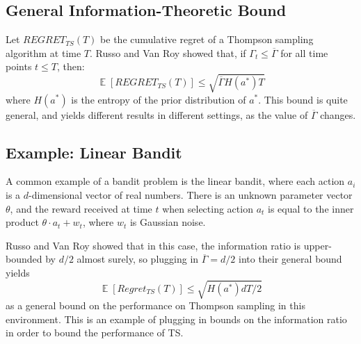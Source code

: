 \documentclass{article}
\DeclareMathOperator{\EX}{\mathbb{E}}
\begin{document}
\subsection{General Information-Theoretic Bound}

Let $REGRET_{TS}(T)$ be the cumulative regret of a Thompson sampling algorithm at time $T$. Russo and Van Roy showed that, if $\Gamma_t\leq \overline{\Gamma}$ for all time points $t\leq T$, then:
$$\EX[REGRET_{TS}(T)] \leq \sqrt{\overline{\Gamma}H(a^*)T}$$
where $H(a^*)$ is the entropy of the prior distribution of $a^*$. This bound is quite general, and yields different results in different settings, as the value of $\overline{\Gamma}$ changes.

\subsection{Example: Linear Bandit}

A common example of a bandit problem is the linear bandit, where each action $a_i$ is a $d$-dimensional vector of real numbers. There is an unknown parameter vector $\theta$, and the reward received at time $t$ when selecting action $a_t$ is equal to the inner product $\theta\cdot a_t + w_t$, where $w_t$ is Gaussian noise.

Russo and Van Roy showed that in this case, the information ratio is upper-bounded by $d/2$ almost surely, so plugging in $\overline{\Gamma} = d/2$ into their general bound yields
$$\EX[Regret_{TS}(T)]\leq \sqrt{H(a^*)dT/2}$$
as a general bound on the performance on Thompson sampling in this environment. This is an example of plugging in bounds on the information ratio in order to bound the performance of TS.
\end{document}
